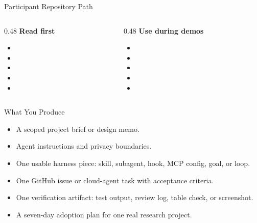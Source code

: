 \begin{frame}{Participant Repository Path}
  \begin{columns}[T,onlytextwidth]
    \begin{column}{0.48\textwidth}
      \textbf{Read first}
      \begin{itemize}
        \item {}
        \item {}
        \item {}
        \item {}
        \item {}
      \end{itemize}
    \end{column}
    \begin{column}{0.48\textwidth}
      \textbf{Use during demos}
      \begin{itemize}
        \item {}
        \item {}
        \item {}
        \item {}
        \item {}
      \end{itemize}
    \end{column}
  \end{columns}
\end{frame}

\begin{frame}{What You Produce}
  \begin{itemize}
    \item A scoped project brief or design memo.
    \item Agent instructions and privacy boundaries.
    \item One usable harness piece: skill, subagent, hook, MCP config, goal, or loop.
    \item One GitHub issue or cloud-agent task with acceptance criteria.
    \item One verification artifact: test output, review log, table check, or screenshot.
    \item A seven-day adoption plan for one real research project.
  \end{itemize}
\end{frame}

